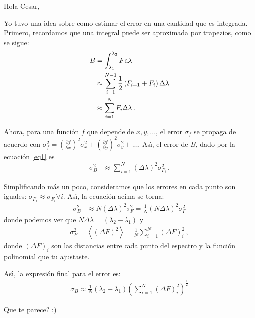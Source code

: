 \documentclass{article}
\begin{document}
%

Hola Cesar, 

Yo tuvo una idea sobre como estimar el error en una cantidad que es integrada. Primero, recordamos que una integral puede ser aproximada por trapezios, como se sigue:
%
\begin{align}
B 
&=
\int_{\lambda_1}^{\lambda_2}F\mathrm{d}\lambda\notag\\
&\approx 
\sum_{i=1}^{N-1}\frac{1}{2}\left(F_{i+1}+F_i\right)\Delta\lambda\notag\\
&\approx
\sum_{i=1}^{N}F_i\Delta\lambda\,.
\label{eq1}
\end{align}
%


Ahora, para una funci\'on $f$ que depende de $x,y,...$, el error $\sigma_f$ se propaga de acuerdo con $\sigma_f^2 = \left(\frac{\partial f}{\partial x}\right)^2\sigma_x^2+\left(\frac{\partial f}{\partial y}\right)^2\sigma_y^2+...$. As\'\i, el error de $B$, dado por la ecuaci\'on \ref{eq1} es
%
\begin{align}
\sigma_B^2
&\approx 
\sum_{i=1}^{N}(\Delta\lambda)^2\sigma_{F_i}^2\,.
\end{align}
%

Simplificando m\'as un poco, consideramos que los errores en cada punto son iguales: $\sigma_{F_i}\approx \sigma_{F_i} \forall i$. As\'\i, la ecuaci\'on acima se torna:
%
\begin{align}
\sigma_B^2
&\approx 
N(\Delta\lambda)^2\sigma_{F}^2 = \frac{1}{N}(N\Delta\lambda)^2\sigma_{F}^2
\end{align}
%
donde podemos ver que $N\Delta\lambda = (\lambda_2-\lambda_1)$ y 
%
\begin{align}
\sigma_F^2=\left\langle(\Delta F)^2\right\rangle=\frac{1}{N}\sum_{i=1}^N(\Delta F)_i^2\,,
\end{align}
%
donde $(\Delta F)_i$ son las distancias entre cada punto del espectro y la funci\'on polinomial que tu ajustaste. 


As\'\i, la expresi\'on final para el error es:
%
\begin{align}
\sigma_B \approx \frac{1}{N}(\lambda_2-\lambda_1)\left(\sum_{i=1}^N(\Delta F)_i^2\right)^\frac{1}{2}
\end{align}
%

Que te parece? :)
\end{document}
